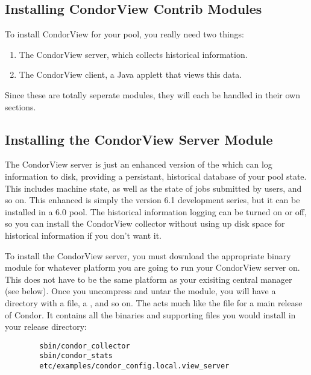 \subsection{\label{sec:Contrib-CondorView-Install}
Installing CondorView Contrib Modules}

To install CondorView for your pool, you really need two things:
\begin{enumerate}
\item The CondorView server, which collects historical information.
\item The CondorView client, a Java applett that views this data.
\end{enumerate}

Since these are totally seperate modules, they will each be handled in
their own sections.

\subsection{\label{sec:CondorView-Server-Install}
Installing the CondorView Server Module}

The CondorView server is just an enhanced version of the
 which can log information to disk, providing a 
persistant, historical database of your pool state.
This includes machine state, as well as the state of jobs submitted by
users, and so on.
This enhanced  is simply the version 6.1 development
series, but it can be installed in a 6.0 pool.
The historical information logging can be turned on or off, so you can
install the CondorView collector without using up disk space for
historical information if you don't want it.

To install the CondorView server, you must download the appropriate
binary module for whatever platform you are going to run your
CondorView server on.
This does not have to be the same platform as your exisiting central
manager (see below).
Once you uncompress and untar the module, you will have a directory
with a  file, a , and so on.
The  acts much like the  file
for a main release of Condor.
It contains all the binaries and supporting files you would install in
your release directory:
\begin{verbatim}
        sbin/condor_collector
        sbin/condor_stats
        etc/examples/condor_config.local.view_server
\end{verbatim}

